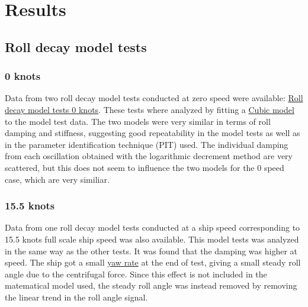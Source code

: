 \section{Results}\label{results}

    \subsection{Roll decay model tests}\label{roll-decay-model-tests}

\subsubsection{0 knots}\label{knots}

Data from two roll decay model tests conducted at zero speed were
available:
\href{../../notebooks/01.2_select_suitable_MDL_test_KLVCC2.ipynb\#rolldecay}{Roll
decay model tests 0 knots}. These tests where analyzed by fitting a
\href{../../notebooks/01.2_select_suitable_MDL_test_KLVCC2.ipynb\#cubic_model}{Cubic
model} to the model test data. The two models were very similar in terms
of roll damping and stiffness, suggesting good repeatability in the
model tests as well as in the parameter identification technique (PIT)
used. The individual damping from each oscillation obtained with the
logarithmic decrement method are very scattered, but this does not seem
to influence the two models for the 0 speed case, which are very
similiar.

    \subsubsection{15.5 knots}\label{knots}

Data from one roll decay model tests conducted at a ship speed
corresponding to 15.5 knots full scale ship speed was also available.
This model tests was analyzed in the same way as the other tests. It was
found that the damping was higher at speed. The ship got a small
\href{../../notebooks/01.3_select_suitable_MDL_test_KLVCC2_speed.ipynb\#yawrate}{yaw
rate} at the end of test, giving a small steady roll angle due to the
centrifugal force. Since this effect is not included in the matematical
model used, the steady roll angle was instead removed by removing the
linear trend in the roll angle signal.

    \begin{figure}
        \begin{center}\end{center}
        \caption{}
        \label{fig:}
    \end{figure}
    
